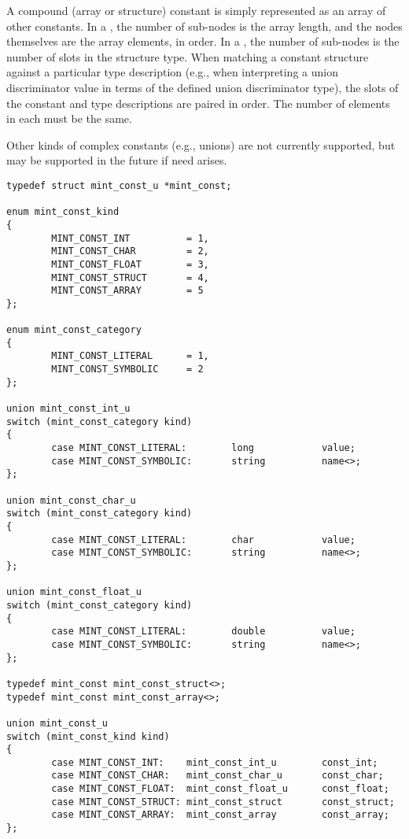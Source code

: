 A compound (array or structure) constant is simply represented as an array of
other \MINT{} constants.  In a , the number of sub-nodes
is the array length, and the nodes themselves are the array elements, in order.
In a , the number of sub-nodes is the number of slots in
the structure type.  When matching a constant structure against a particular
 type description (e.g., when interpreting a union
discriminator value in terms of the defined union discriminator type), the
slots of the constant and type descriptions are paired in order.  The number of
elements in each must be the same.

Other kinds of complex constants (e.g., unions) are not currently supported,
but may be supported in the future if need arises.

\begin{verbatim}
typedef struct mint_const_u *mint_const;

enum mint_const_kind
{
        MINT_CONST_INT          = 1,
        MINT_CONST_CHAR         = 2,
        MINT_CONST_FLOAT        = 3,
        MINT_CONST_STRUCT       = 4,
        MINT_CONST_ARRAY        = 5
};

enum mint_const_category
{
        MINT_CONST_LITERAL      = 1,
        MINT_CONST_SYMBOLIC     = 2
};

union mint_const_int_u
switch (mint_const_category kind)
{
        case MINT_CONST_LITERAL:        long            value;
        case MINT_CONST_SYMBOLIC:       string          name<>;
};

union mint_const_char_u
switch (mint_const_category kind)
{
        case MINT_CONST_LITERAL:        char            value;
        case MINT_CONST_SYMBOLIC:       string          name<>;
};

union mint_const_float_u
switch (mint_const_category kind)
{
        case MINT_CONST_LITERAL:        double          value;
        case MINT_CONST_SYMBOLIC:       string          name<>;
};

typedef mint_const mint_const_struct<>;
typedef mint_const mint_const_array<>;

union mint_const_u
switch (mint_const_kind kind)
{
        case MINT_CONST_INT:    mint_const_int_u        const_int;
        case MINT_CONST_CHAR:   mint_const_char_u       const_char;
        case MINT_CONST_FLOAT:  mint_const_float_u      const_float;
        case MINT_CONST_STRUCT: mint_const_struct       const_struct;
        case MINT_CONST_ARRAY:  mint_const_array        const_array;
};
\end{verbatim}


